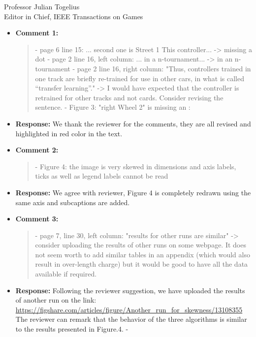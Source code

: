 \documentclass[10pt]{letter} %
\begin{document}
\begin{letter}{Professor Julian Togelius \\ Editor in Chief, IEEE Transactions on Games}
\begin{enumerate}
		\begin{itemize}
			\item {\bf Comment 1:}
				\begin{quote}
					- page 6 line 15: ... second one is Street 1 This controller... -> missing a dot
					- page 2 line 16, left column: ... in a n-tournament... -> in an n-tournament
					- page 2 line 16, right column: "Thus, controllers trained in one track are briefly re-trained for use in other cars, in what is called “transfer learning”." -> I would have expected that the controller is retrained for other tracks and not cards. Consider revising the sentence.
					- Figure 3: "right Wheel 2" is missing an :
				\end{quote}	
			\item {\bf Response:} 
					We thank the reviewer for the comments, they are all revised and highlighted in red color in the text.
			\item {\bf Comment 2:}
				\begin{quote}
					- Figure 4: the image is very skewed in dimensions and axis labels, ticks as well as legend labels cannot be read
				\end{quote}	
			\item {\bf Response:} 
				We agree with reviewer, Figure 4 is completely redrawn using the same axis and subcaptions are added. 
			\item {\bf Comment 3:}
				\begin{quote}
					- page 7, line 30, left column: "results for other runs are similar" -> consider uploading the results of other runs on some webpage. It does not seem worth to add similar tables in an appendix (which would also result in over-length charge) but it would be good to have all the data available if required.
				\end{quote}	
			\item {\bf Response:} 
				Following the reviewer suggestion, we have uploaded  the results of another run on the link:\\
			\url{	https://figshare.com/articles/figure/Another\_run\_for\_skewness/13108355}\\
			The reviewer can remark that the behavior of the three algorithms is similar to the results presented in Figure.4.
		-
	   \end{itemize}


\end{enumerate}
\end{letter}
\end{document}
